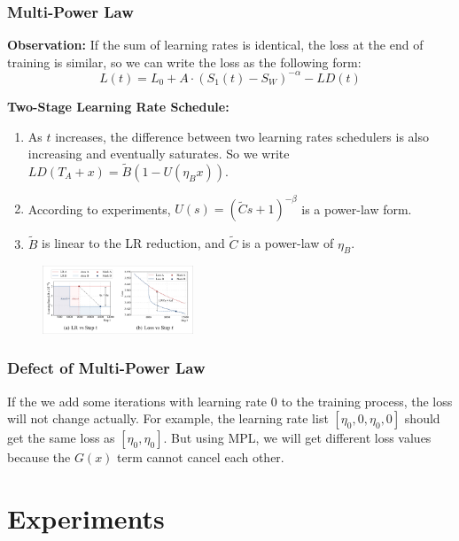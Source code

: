 \documentclass[aspectratio=169]{beamer}
\begin{document}
\begin{frame}
    \frametitle{Multi-Power Law}
    \textbf{Observation:} If the sum of learning rates is identical, the
    loss at the end of training is similar, so we can write the loss
    as the following form:
    \begin{equation}
        L(t) = L_0 + A\cdot (S_1(t)-S_W)^{-\alpha} - LD(t)
    \end{equation}

    \textbf{Two-Stage Learning Rate Schedule:}
    \begin{enumerate}
        \item As $t$ increases, the difference between two learning
            rates schedulers is also increasing and eventually saturates.
            So we write $LD(T_A+x) = \tilde{B}(1-U(\eta_B x))$.
        \item According to experiments, $U(s) =
            (\tilde{C}s+1)^{-\beta}$ is a power-law form.
        \item $\tilde{B}$ is linear to the LR reduction, and $\tilde{C}$
            is a power-law of $\eta_B$.
    \end{enumerate}
    \begin{figure}
        \centering
        \includegraphics[width=0.4\textwidth]{fig/mpl.png}
    \end{figure}
\end{frame}

\begin{frame}
    \frametitle{Defect of Multi-Power Law}
    If the we add some iterations with learning rate 0
    to the training process, the loss will not change actually.
    For example, the learning rate list $[\eta_0,0,\eta_0,0]$ should
    get the same loss as $[\eta_0,\eta_0]$.
    But using MPL, we will get different loss values because
    the $G(x)$ term cannot cancel each other.
\end{frame}

\section{Experiments}\label{sec:experiments}
\end{document}
